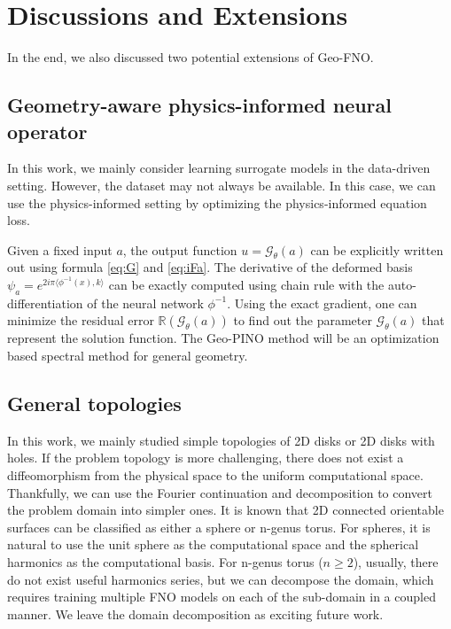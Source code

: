 \documentclass{article}
\newcommand{\R}{\mathbb{R}}
\newcommand{\G}{\mathcal{G}}
\begin{document}
\section{Discussions and Extensions}
In the end, we also discussed two potential extensions of Geo-FNO.

\subsection{Geometry-aware physics-informed neural operator}
In this work, we mainly consider learning surrogate models in the data-driven setting. However, the dataset may not always be available. In this case, we can use the physics-informed setting by optimizing the physics-informed equation loss.

Given a fixed input $a$, the output function $u = \G_\theta(a)$ can be explicitly written out using formula \eqref{eq:G} and \eqref{eq:iFa}. The derivative of the deformed basis $\psi_a = e^{2i \pi \langle \phi^{-1}(x), k \rangle}$ can be exactly computed using chain rule with the auto-differentiation of the neural network $ \phi^{-1} $. Using the exact gradient, one can minimize the residual error $\R(\G_\theta(a))$ to find out the parameter $\G_\theta(a)$ that represent the solution function. The Geo-PINO method will be an optimization based spectral method for general geometry.

\subsection{General topologies}
In this work, we mainly studied simple topologies of 2D disks or 2D disks with holes. If the problem topology is more challenging, there does not exist a diffeomorphism from the physical space to the uniform computational space. Thankfully, we can use the Fourier continuation and decomposition to convert the problem domain into simpler ones. It is known that 2D connected orientable surfaces can be classified as either a sphere or n-genus torus. For spheres, it is natural to use the unit sphere as the computational space and the spherical harmonics as the computational basis. For n-genus torus ($n\geq 2$), usually, there do not exist useful harmonics series, but we can decompose the domain, which requires training multiple FNO models on each of the sub-domain in a coupled manner. We leave the domain decomposition as exciting future work. 
\end{document}

